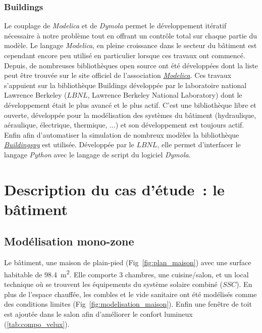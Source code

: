 \subsubsection{Buildings} %
\label{ssub:buildings}
Le couplage de \emph{Modelica} et de \emph{Dymola} permet le développement itératif
nécessaire à notre problème tout en offrant un contrôle total sur chaque partie du modèle.
Le langage \emph{Modelica}, en pleine croissance dans le secteur du bâtiment est cependant
encore peu utilisé en particulier lorsque ces travaux ont commencé. Depuis, de nombreuses
bibliothèques open source ont été développées dont la liste peut être trouvée sur le site
officiel de l’association \href{https://www.modelica.org/libraries}{\emph{Modelica}}. Ces
travaux s’appuient sur la bibliothèque Buildings \parencite{Wetter2014253} développée par le laboratoire
national Lawrence Berkeley ($LBNL$, Lawrence Berkeley National Laboratory) dont le
développement était le plus avancé et le plus actif. C’est une bibliothèque libre et
ouverte, développée pour la modélisation des systèmes du bâtiment (hydraulique,
aéraulique, électrique, thermique, ...) et son développement est toujours actif. Enfin
afin d’automatiser la simulation de nombreux modèles la bibliothèque
\href{http://simulationresearch.lbl.gov/modelica/buildingspy/}{\emph{Buildingspy}}
est utilisée. Développée par le $LBNL$, elle permet d’interfacer le langage \emph{Python}
avec le langage de script du logiciel \emph{Dymola}.




\section{Description du cas d’étude~: le bâtiment} %
\label{sec:description_du_cas_d_etude_le_batiment}
\subsection{Modélisation mono-zone} %
\label{sub:modelisation_monozone}
Le bâtiment, une maison de plain-pied (Fig~\ref{fig:plan_maison}) avec une surface habitable
de \SI{98.4}{\meter\squared}. Elle comporte 3 chambres, une cuisine/salon, et un local
technique où se trouvent les équipements du système solaire combiné ($SSC$). En plus de
l’espace chauffée, les combles et le vide sanitaire ont été modélisés comme des conditions
limites (Fig~\ref{fig:modelisation_maison}). Enfin une fenêtre de toit est ajoutée dans
le salon afin d’améliorer le confort lumineux (\autoref{tab:compo_velux}).

